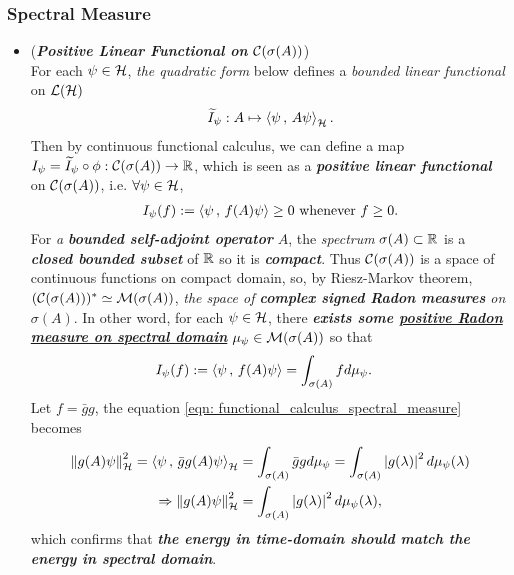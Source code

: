 \documentclass[11pt]{article}
\begin{document}
\subsubsection{Spectral Measure}
\begin{itemize}
\item \begin{remark} (\emph{\textbf{Positive Linear Functional on ${\mathcal C}(\sigma(A))$}})\\
For each $\psi \in {\mathcal H}$, \emph{the quadratic form} below defines a \emph{bounded linear functional} on ${\mathcal L}({\mathcal H})$
\begin{align*}
\widetilde{I}_{\psi}: A \mapsto \left\langle \psi\,,\, A \psi \right\rangle_{{\mathcal H}}.
\end{align*} Then by continuous functional calculus, we can define a map $I_{\psi} =\widetilde{I}_{\psi} \circ \phi: {\mathcal C}(\sigma(A)) \rightarrow  {\mathbb R}$, which is seen as a \emph{\textbf{positive linear functional}} on ${\mathcal C}(\sigma(A))$, i.e. $\forall \psi \in {\mathcal H}$,
\begin{align*}
I_{\psi}(f) := \left\langle \psi\,,\, f(A)\psi \right\rangle \ge 0 \text{ whenever }f\ge 0.
\end{align*}
For \emph{a \textbf{bounded self-adjoint operator}} $A$, the \emph{spectrum} $\sigma(A) \subset {\mathbb R}$ is a \emph{\textbf{closed bounded subset}} of ${\mathbb R}$ so it is \emph{\textbf{compact}}. Thus ${\mathcal C}(\sigma(A))$ is a space of continuous functions on compact domain, so, by Riesz-Markov theorem, $({\mathcal C}(\sigma(A)))^{*} \simeq {\mathcal M}(\sigma(A))$, \emph{the space of \textbf{complex signed Radon measures} on $\sigma(A)$}. In other word, for each $\psi \in {\mathcal H}$, there \emph{\textbf{exists some \underline{positive Radon measure on spectral domain}}} $\mu_{\psi} \in {\mathcal M}(\sigma(A))$ so that 
\begin{align}
I_{\psi}(f) := \left\langle \psi\,,\, f(A)\psi \right\rangle &= \int_{\sigma(A)} f d\mu_{\psi}. \label{eqn: functional_calculus_spectral_measure}
\end{align} Let $f = \bar{g}g$, the equation \eqref{eqn: functional_calculus_spectral_measure} becomes
\begin{align}
\left\|g(A)\psi\right\|_{{\mathcal H}}^2 = \left\langle \psi\,,\, \bar{g}g(A)\psi \right\rangle_{{\mathcal H}} &= \int_{\sigma(A)} \bar{g}g d\mu_{\psi} = \int_{\sigma(A)} \left\lvert g(\lambda) \right\rvert^2 d\mu_{\psi}(\lambda) \nonumber\\
\Rightarrow \left\|g(A)\psi\right\|_{{\mathcal H}}^2 &= \int_{\sigma(A)} \left\lvert g(\lambda) \right\rvert^2 d\mu_{\psi}(\lambda),  \label{eqn: time_specturm_energy_preserve}
\end{align}
 which confirms that \emph{\textbf{the energy in time-domain should match the energy in spectral domain}}.
\end{remark}


\end{itemize}
\end{document}
